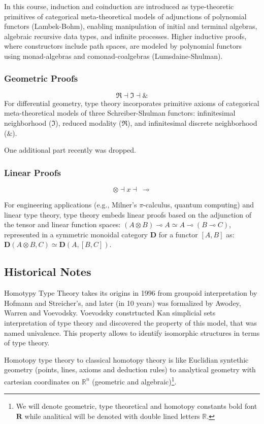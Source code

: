 \documentclass{article}
\theoremstyle{definition}
\begin{document}
In this course, induction and coinduction are introduced as type-theoretic
primitives of categorical meta-theoretical models of adjunctions of
polynomial functors (Lambek-Bohm), enabling manipulation of initial
and terminal algebras, algebraic recursive data types, and infinite
processes. Higher inductive proofs, where constructors include path
spaces, are modeled by polynomial functors using monad-algebras and
comonad-coalgebras (Lumsdaine-Shulman).

\subsubsection{Geometric Proofs}
$$
\Re \dashv \Im \dashv \&
$$
For differential geometry, type theory incorporates primitive axioms of
categorical meta-theoretical models of three Schreiber-Shulman functors:
infinitesimal neighborhood (\(\Im\)), reduced modality (\(\Re\)), and
infinitesimal discrete neighborhood (\(\&\)).

\newpage
One additional part recently was dropped.

\subsubsection{Linear Proofs}

$$
\otimes \dashv x \dashv\ \multimap
$$

For engineering applications (e.g., Milner's $\pi$-calculus, quantum computing)
and linear type theory, type theory embeds linear proofs based on the adjunction
of the tensor and linear function spaces: $(A \otimes B) \multimap A \simeq A \multimap (B \multimap C)$,
represented in a symmetric monoidal category $\mathbf{D}$ for a functor $[A,B]$ as:
$\mathbf{D}(A \otimes B, C) \simeq \mathbf{D}(A, [B,C])$.

\subsection{Historical Notes}
Homotypy Type Theory takes its origins in 1996 from groupoid interpretation by
Hofmann and Streicher's, and later (in 10 years) was formalized by Awodey,
Warren and Voevodsky. Voevodsky constrtucted Kan simplicial sets interpretation
of type theory and discovered the property of this model, that was named univalence.
This property allows to identify isomorphic structures in terms of type theory.

Homotopy type theory to classical homotopy theory is like Euclidian
syntethic geometry (points, lines, axioms and deduction rules) to
analytical geometry with cartesian coordinates on $\mathbb{R}^n$ (geometric and algebraic)\footnote{We will denote geometric, type theoretical and homotopy constants
bold font $\mathbf{R}$ while analitical will be denoted with double lined letters $\mathbb{R}$.}.
\end{document}

